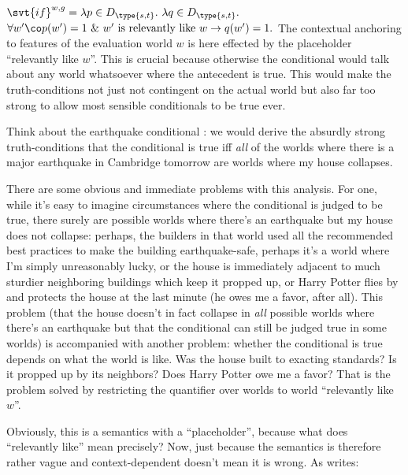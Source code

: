 \ex\label{ex:if-strict-context}%
$\svt{if}^{w,g} = \lambda p \in D_{\type{s,t}}.\ \lambda q \in
D_{\type{s,t}}.$ \\
\hfill $\forall w'\co p(w')=1\ \&\ w' \text{ is relevantly like } w \rightarrow
q(w')=1.$ \xe
%
The contextual anchoring to features of the evaluation world $w$ is here
effected by the placeholder ``relevantly like $w$''. This is crucial because
otherwise the conditional would talk about any world whatsoever where the
antecedent is true. This would make the truth-conditions not just not contingent
on the actual world but also far too strong to allow most sensible conditionals
to be true ever.

Think about the earthquake conditional : we would derive the
absurdly strong truth-conditions that the conditional is true iff \emph{all} of
the worlds where there is a major earthquake in Cambridge tomorrow are worlds
where my house collapses.

There are some obvious and immediate problems with this analysis. For one, while
it's easy to imagine circumstances where the conditional  is
judged to be true, there surely are possible worlds where there's an earthquake
but my house does not collapse: perhaps, the builders in that world used all the
recommended best practices to make the building earthquake-safe, perhaps it's a
world where I'm simply unreasonably lucky, or the house is immediately adjacent
to much sturdier neighboring buildings which keep it propped up, or Harry Potter
flies by and protects the house at the last minute (he owes me a favor, after
all). This problem (that the house doesn't in fact collapse in \emph{all}
possible worlds where there's an earthquake but that the conditional can still
be judged true in some worlds) is accompanied with another problem: whether the
conditional is true depends on what the world is like. Was the house built to
exacting standards? Is it propped up by its neighbors? Does Harry Potter owe me
a favor? That is the problem solved by restricting the quantifier over worlds to
world ``relevantly like $w$''.

\enlargethispage{24pt}
Obviously, this is a semantics with a ``placeholder'', because what does
``relevantly like'' mean precisely? Now, just because the semantics is therefore
rather vague and context-dependent doesn't mean it is wrong. As
\cite[p.1]{lewis-1973-counterfactuals} writes:

